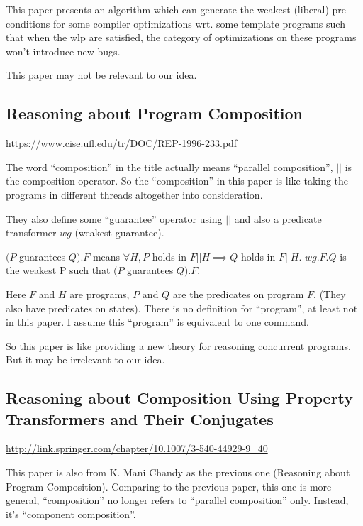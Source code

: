 \documentclass[12pt, fleqn]{article}
\begin{document}
\bigskip

This paper presents an algorithm which can generate the weakest
(liberal) pre-conditions for some compiler optimizations wrt. some
template programs such that when the wlp are satisfied, the category
of optimizations on these programs won't introduce new bugs.

This paper may not be relevant to our idea.


\subsection{Reasoning about Program Composition}

\url{https://www.cise.ufl.edu/tr/DOC/REP-1996-233.pdf}

\bigskip

The word ``composition'' in the title actually means ``parallel
composition'', $||$ is the composition operator. So the
``composition'' in this paper is like taking the programs in different
threads altogether into consideration.

They also define some ``guarantee'' operator using $||$ and also a
predicate transformer $wg$ (weakest guarantee).

$(P$ guarantees $Q).F$ means $\forall H, P$ holds in $F || H \implies
Q$ holds in $F || H$. $wg.F.Q$ is the weakest P such that $(P$
guarantees $Q).F$.

Here $F$ and $H$ are programs, $P$ and $Q$ are the predicates on
program $F$. (They also have predicates on states). There is no
definition for ``program'', at least not in this paper. I assume this
``program'' is equivalent to one command.

So this paper is like providing a new theory for reasoning concurrent
programs. But it may be irrelevant to our idea.


\subsection{Reasoning about Composition Using Property Transformers and Their Conjugates}

\url{http://link.springer.com/chapter/10.1007/3-540-44929-9_40}

\bigskip

This paper is also from K. Mani Chandy as the previous one (Reasoning
about Program Composition). Comparing to the previous paper, this one
is more general, ``composition'' no longer refers to ``parallel
composition'' only. Instead, it's ``component composition''.
\end{document}
